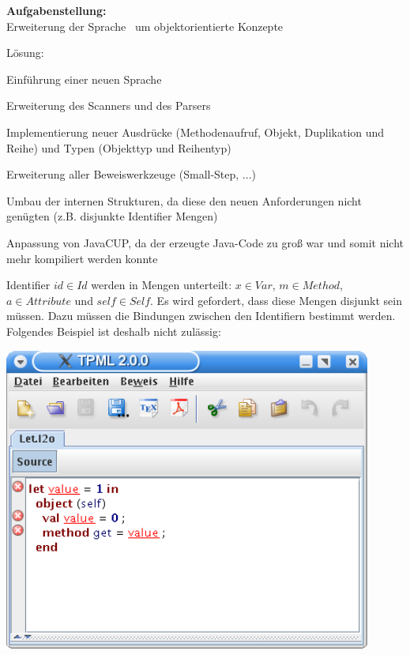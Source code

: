 {
  \textbf{Aufgabenstellung:}\\[2mm]
  Erweiterung der Sprache \LTWO\ um objektorientierte Konzepte

  {
    \begin{itemgroup}{Lösung:}
      \item Einführung einer neuen Sprache \LTWOO
      \item Erweiterung des Scanners und des Parsers
      \item Implementierung neuer Ausdrücke (Methodenaufruf, Objekt, Duplikation und Reihe)
            und Typen (Objekttyp und Reihentyp)
      \item Erweiterung aller Beweiswerkzeuge (Small-Step, ...)
      \item Umbau der internen Strukturen, da diese den neuen Anforderungen
            nicht genügten (z.B. disjunkte Identifier Mengen)
      \item Anpassung von JavaCUP, da der erzeugte Java-Code zu groß war
            und somit nicht mehr kompiliert werden konnte
    \end{itemgroup}
  }
}

{
  Identifier $id \in Id$ werden in Mengen unterteilt: $x \in Var$, $m \in Method$, $a \in Attribute$ 
  und $self \in Self$. Es wird gefordert, dass diese Mengen disjunkt sein müssen.
  Dazu müssen die Bindungen zwischen den Identifiern bestimmt werden. Folgendes
  Beispiel ist deshalb nicht zulässig:

  \begin{center}
    \includegraphics[height=10cm]{images/object_disjunction.png}
  \end{center}
}


